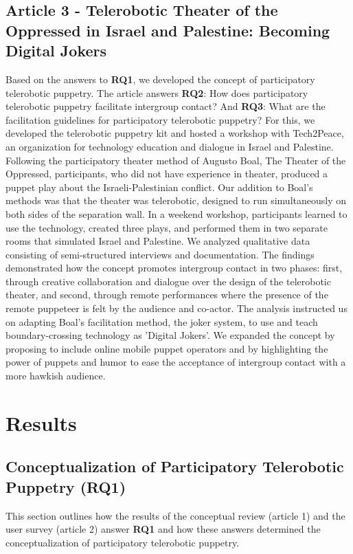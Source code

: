 \documentclass[dissertation,math,vertlayout,pdfa,colorlinks]{aaltoseries}
\begin{document}
\section{Article 3 - Telerobotic Theater of the Oppressed in Israel and Palestine: Becoming Digital Jokers}
Based on the answers to \textbf{RQ1}, we developed the concept of participatory telerobotic puppetry. The article answers \textbf{RQ2}: How does participatory telerobotic puppetry facilitate intergroup contact? And \textbf{RQ3}: What are the facilitation guidelines for participatory telerobotic puppetry? For this, we developed the telerobotic puppetry kit and hosted a workshop with Tech2Peace, an organization for technology education and dialogue in Israel and Palestine. Following the participatory theater method of Augusto Boal, The Theater of the Oppressed, participants, who did not have experience in theater, produced a puppet play about the Israeli-Palestinian conflict. Our addition to Boal's methods was that the theater was telerobotic, designed to run simultaneously on both sides of the separation wall. In a weekend workshop, participants learned to use the technology, created three plays, and performed them in two separate rooms that simulated Israel and Palestine. We analyzed qualitative data consisting of semi-structured interviews and documentation. The findings demonstrated how the concept promotes intergroup contact in two phases: first, through creative collaboration and dialogue over the design of the telerobotic theater, and second, through remote performances where the presence of the remote puppeteer is felt by the audience and co-actor. The analysis instructed us on adapting Boal's facilitation method, the joker system, to use and teach boundary-crossing technology as 'Digital Jokers'. We expanded the concept by proposing to include online mobile puppet operators and by highlighting the power of puppets and humor to ease the acceptance of intergroup contact with a more hawkish audience.  
% 
\chapter{Results}

\section{Conceptualization of Participatory Telerobotic Puppetry (RQ1)}
This section outlines how the results of the conceptual review (article 1) and the user survey (article 2) answer \textbf{RQ1} and how these answers determined the conceptualization of participatory telerobotic puppetry.
\end{document}
